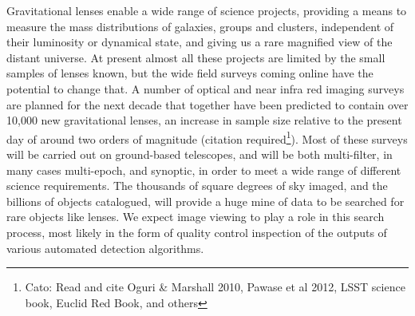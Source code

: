 \documentclass[letterpaper, 11pt]{article}
\begin{document}
Gravitational lenses enable a wide range of science projects, providing a
means to measure the mass distributions of  galaxies, groups and clusters,
independent of their luminosity or dynamical state, and giving us a rare
magnified view of the distant universe. At present almost all these projects
are limited by the small samples of lenses known, but the wide field surveys
coming online have the potential to change that. A number of optical and near
infra red imaging surveys are planned for the next decade that together have
been predicted to contain over 10,000 new gravitational lenses, an increase in
sample size relative to the present day of around two orders of magnitude
(citation required\footnote{Cato: Read and cite Oguri \& Marshall 2010, Pawase
et al 2012, LSST science book, Euclid Red Book, and others}). Most of these
surveys will be carried out on ground-based telescopes, and will be both
multi-filter, in many cases multi-epoch, and synoptic, in order to meet a wide
range of different science requirements. The thousands of square degrees of
sky imaged, and the billions of objects catalogued, will provide a huge mine
of data to be searched for rare objects like lenses. We expect image viewing
to play a role in this search process, most likely in the form of quality
control inspection of the outputs of various automated detection algorithms.
\end{document}
